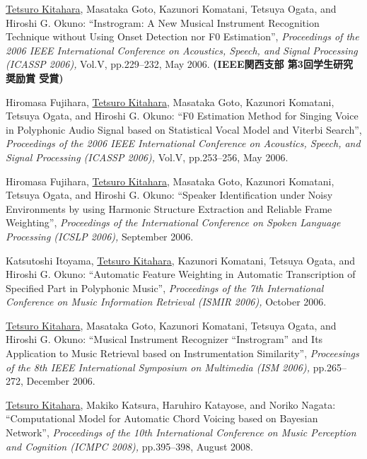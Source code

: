 \begin{Enumerate}
\item 
\underline{Tetsuro Kitahara}, 
Masataka Goto, 
Kazunori Komatani, 
Tetsuya
      Ogata, 
and 
Hiroshi
      G. Okuno: 
    ``Instrogram: A New Musical Instrument Recognition Technique without Using Onset Detection
      nor F0 Estimation'', 
    {\it Proceedings of
      the 2006 IEEE International Conference on Acoustics, Speech, and Signal Processing
          (ICASSP 2006),
        } Vol.V, pp.229--232, May 2006. 
{\bf (IEEE関西支部 第3回学生研究奨励賞 受賞)}
\item 
Hiromasa Fujihara, 
\underline{Tetsuro Kitahara}, 
Masataka Goto, 
Kazunori Komatani, 
Tetsuya
      Ogata, 
and 
Hiroshi
      G. Okuno: 
    ``F0 Estimation Method for Singing Voice in Polyphonic Audio Signal based on Statistical
      Vocal Model and Viterbi Search'', 
    {\it Proceedings of
      the 2006 IEEE International Conference on Acoustics, Speech, and Signal Processing
          (ICASSP 2006),
        } Vol.V, pp.253--256, May 2006. 

\item 
Hiromasa Fujihara, 
\underline{Tetsuro Kitahara}, 
Masataka Goto, 
Kazunori Komatani, 
Tetsuya
      Ogata, 
and 
Hiroshi
      G. Okuno: 
    ``Speaker Identification under Noisy Environments by using Harmonic Structure Extraction
      and Reliable Frame Weighting'', 
    {\it Proceedings of the International Conference on
      Spoken Language Processing
          (ICSLP 2006),
        } September 2006. 

\item 
Katsutoshi Itoyama, 
\underline{Tetsuro Kitahara}, 
Kazunori Komatani, 
Tetsuya
      Ogata, 
and 
Hiroshi
      G. Okuno: 
    ``Automatic Feature Weighting in Automatic Transcription of Specified Part in Polyphonic
      Music'', 
    {\it Proceedings of
      the 7th International Conference on Music Information Retrieval 
          (ISMIR 2006),
        } October 2006. 

\item 
\underline{Tetsuro Kitahara}, 
Masataka Goto, 
Kazunori Komatani, 
Tetsuya
      Ogata, 
and 
Hiroshi
      G. Okuno: 
    ``Musical Instrument Recognizer ``Instrogram'' and Its Application to Music Retrieval based
      on Instrumentation Similarity'', 
    {\it Proceesings of the 8th IEEE International Symposium on
      Multimedia
          (ISM 2006),
        } pp.265--272, December 2006. 

\item 
\underline{Tetsuro Kitahara}, 
Makiko Katsura, 
Haruhiro Katayose, 
and 
Noriko Nagata: 
    ``Computational Model for Automatic Chord Voicing based on Bayesian Network'', 
    {\it Proceedings of the 10th International Conference on
      Music Perception and Cognition
          (ICMPC 2008),
        } pp.395--398, August 2008. 


\end{Enumerate}

